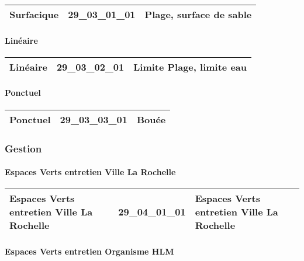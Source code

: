 \documentclass[12pt,titlepage]{book}
\begin{document}
\renewcommand{\arraystretch}{1.2}
\begin{supertabular}{|p{10cm}|c|p{15cm}|}
 Surfacique & 29\_03\_01\_01 & Plage, surface de sable\\
\hline
\end{supertabular}


\paragraph{Linéaire}
\noindent
\vspace{\baselineskip}

\renewcommand{\arraystretch}{1.2}
\begin{supertabular}{|p{10cm}|c|p{15cm}|}
 Linéaire & 29\_03\_02\_01 & Limite Plage, limite eau\\
\hline
\end{supertabular}


\paragraph{Ponctuel}
\noindent
\vspace{\baselineskip}

\renewcommand{\arraystretch}{1.2}
\begin{supertabular}{|p{10cm}|c|p{15cm}|}
 Ponctuel & 29\_03\_03\_01 & Bouée\\
\hline
\end{supertabular}

\subsubsection{\large Gestion}
\paragraph{Espaces Verts entretien Ville La Rochelle}
\noindent
\vspace{\baselineskip}

\renewcommand{\arraystretch}{1.2}
\begin{supertabular}{|p{10cm}|c|p{15cm}|}
 Espaces Verts entretien Ville La Rochelle & 29\_04\_01\_01 & Espaces Verts entretien Ville La Rochelle\\
\hline
\end{supertabular}


\paragraph{Espaces Verts entretien Organisme HLM}
\noindent
\vspace{\baselineskip}
\end{document}
